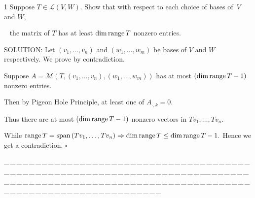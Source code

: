\documentclass[a4paper, 11pt, UTF8]{article}
\def\range{\textup{range}\,}
\def\Spn{\textup{span}\,}
\def\Lm{\mathcal{L}}
\def\Mt{\mathcal{M}}
\begin{document}
\begin{large}
{\timesbf\Large 1} {\timessl\Large 
Suppose $T\in\Lm(V, W)$. Show that with respect to each choice of bases of \,$V$ and $W$,}\par\,\,\,
{\timessl\Large the matrix of $T$ has at least $\dim\range T$ nonzero entries.
}\par
{\timesbf S\footnotesize{OLUTION:}} Let $(v_1,\dots,v_n)$ and $(w_1,\dots,w_m)$ be bases of $V$ and $W$ respectively. We prove by contradiction.\par\quad
Suppose $A=\Mt(T,(v_1,\dots,v_n),(w_1,\dots,w_m))$ has at most $(\dim\range T-1)$ nonzero entries.\par\quad
Then by Pigeon Hole Principle, at least one of $A_{\cdot,k}=0$.\par\quad
Thus there are at most $(\dim\range T-1)$ nonzero vectors in $Tv_1,\dots,Tv_n$.\par\quad
While $\range T=\Spn(Tv_1,\dots,Tv_n)\Rightarrow\dim\range T\leq \dim\range T-1.$ Hence we get a contradiction.$\,\,\square$
\par
{\tiny \_\,\_\,\_\,\_\,\_\,\_\,\_\,\_\,\_\,\_\,\_\,\_\,\_\,\_\,\_\,\_\,\_\,\_\,\_\,\_\,\_\,\_\,\_\,\_\,\_\,\_\,\_\,\_\,\_\,\_\,\_\,\_\,\_\,\_\,\_\,\_\,\_\,\_\,\_\,\_\,\_\,\_\,\_\,\_\,\_\,\_\,\_\,\_\,\_\,\_\,\_\,\_\,\_\,\_\,\_\,\_\,\_\,\_\,\_\,\_\,\_\,\_\,\_\,\_\,\_\,\_\,\_\,\_\,\_\,\_\,\_\_\,\_\,\_\,\_\,\_\,\_\,\_\,\_\,\_\,\_\,\_\,\_\,\_\,\_\,\_\,\_\,\_\,\_\,\_\,\_\,\_\,\_\,\_\,\_\,\_\,\_\,\_\,\_\,\_\,\_\,\_\,\_\,\_\,\_\,\_\,\_\,\_\,\_\,\_\,\_\,\_\,\_\,\_\,\_\,\_\,\_\,\_\,\_\,\_\,\_\,\_\,\_\,\_\,\_\,\_\,\_\,\_\,\_\,\_\,\_\,\_\,\_\,\_\,\_\,\_\,\_\,\_\,\_\,\_\,\_\,\_}\par


\end{large}
\end{document}
